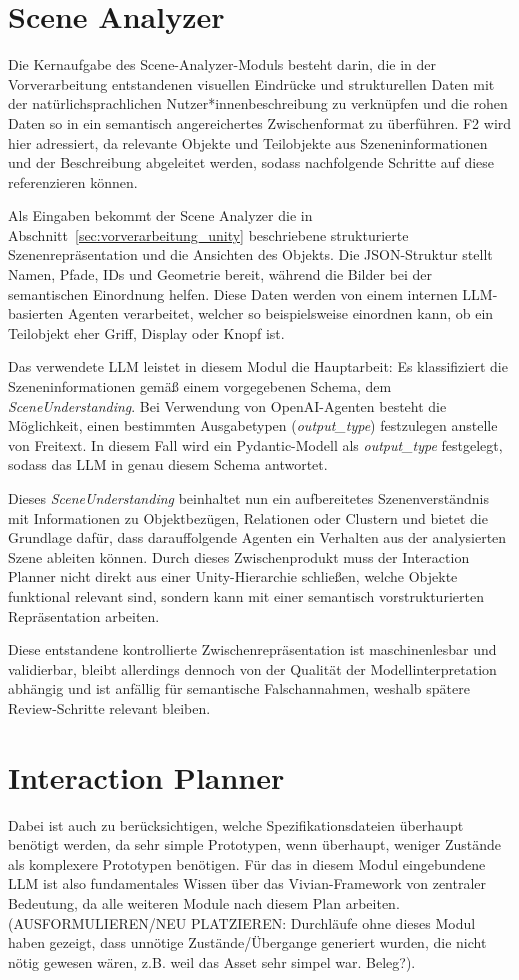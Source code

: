 \section{Scene Analyzer}

Die Kernaufgabe des Scene-Analyzer-Moduls besteht darin, die in der Vorverarbeitung entstandenen visuellen Eindrücke und strukturellen Daten mit der natürlichsprachlichen Nutzer*innenbeschreibung zu verknüpfen und die rohen Daten so in ein semantisch angereichertes Zwischenformat zu überführen. F2 wird hier adressiert, da relevante Objekte und Teilobjekte aus Szeneninformationen und der Beschreibung abgeleitet werden, sodass nachfolgende Schritte auf diese referenzieren können.

Als Eingaben bekommt der Scene Analyzer die in Abschnitt~\ref{sec:vorverarbeitung_unity} beschriebene strukturierte Szenenrepräsentation und die Ansichten des Objekts.
Die JSON-Struktur stellt Namen, Pfade, IDs und Geometrie bereit, während die Bilder bei der semantischen Einordnung helfen.
Diese Daten werden von einem internen LLM-basierten Agenten verarbeitet, welcher so beispielsweise einordnen kann, ob ein Teilobjekt eher Griff, Display oder Knopf ist.

Das verwendete LLM leistet in diesem Modul die Hauptarbeit: Es klassifiziert die Szeneninformationen gemäß einem vorgegebenen Schema, dem \textit{SceneUnderstanding}.
Bei Verwendung von OpenAI-Agenten besteht die Möglichkeit, einen bestimmten Ausgabetypen (\textit{output\_type}) festzulegen anstelle von Freitext.
In diesem Fall wird ein \glqq Pydantic\grqq{}-Modell als \textit{output\_type} festgelegt, sodass das LLM in genau diesem Schema antwortet.

Dieses \textit{SceneUnderstanding} beinhaltet nun ein aufbereitetes Szenenverständnis mit Informationen zu Objektbezügen, Relationen oder Clustern und bietet die Grundlage dafür, dass darauffolgende Agenten ein Verhalten aus der analysierten Szene ableiten können. Durch dieses Zwischenprodukt muss der Interaction Planner nicht direkt aus einer Unity-Hierarchie schließen, welche Objekte funktional relevant sind, sondern kann mit einer semantisch vorstrukturierten Repräsentation arbeiten.

Diese entstandene kontrollierte Zwischenrepräsentation ist maschinenlesbar und validierbar, bleibt allerdings dennoch von der Qualität der Modellinterpretation abhängig und ist anfällig für semantische Falschannahmen, weshalb spätere Review-Schritte relevant bleiben.


\section{Interaction Planner}
Dabei ist auch zu berücksichtigen, welche Spezifikationsdateien überhaupt benötigt werden, da sehr simple Prototypen, wenn überhaupt, weniger Zustände als komplexere Prototypen benötigen.
Für das in diesem Modul eingebundene LLM ist also fundamentales Wissen über das Vivian-Framework von zentraler Bedeutung, da alle weiteren Module nach diesem Plan arbeiten.
(AUSFORMULIEREN/NEU PLATZIEREN: Durchläufe ohne dieses Modul haben gezeigt, dass unnötige Zustände/Übergange generiert wurden, die nicht nötig gewesen wären, z.B. weil das Asset sehr simpel war. Beleg?).

